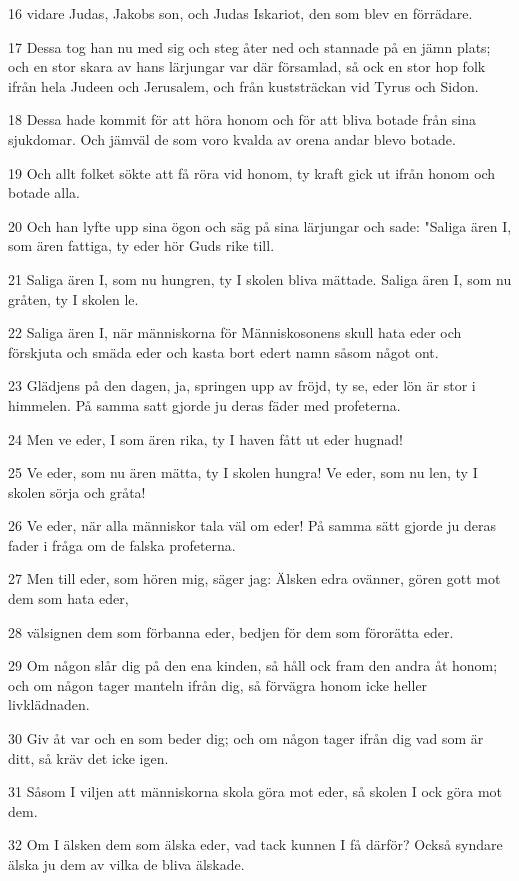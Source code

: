 \par 16 vidare Judas, Jakobs son, och Judas Iskariot, den som blev en förrädare.
\par 17 Dessa tog han nu med sig och steg åter ned och stannade på en jämn plats; och en stor skara av hans lärjungar var där församlad, så ock en stor hop folk ifrån hela Judeen och Jerusalem, och från kuststräckan vid Tyrus och Sidon.
\par 18 Dessa hade kommit för att höra honom och för att bliva botade från sina sjukdomar. Och jämväl de som voro kvalda av orena andar blevo botade.
\par 19 Och allt folket sökte att få röra vid honom, ty kraft gick ut ifrån honom och botade alla.
\par 20 Och han lyfte upp sina ögon och säg på sina lärjungar och sade: "Saliga ären I, som ären fattiga, ty eder hör Guds rike till.
\par 21 Saliga ären I, som nu hungren, ty I skolen bliva mättade. Saliga ären I, som nu gråten, ty I skolen le.
\par 22 Saliga ären I, när människorna för Människosonens skull hata eder och förskjuta och smäda eder och kasta bort edert namn såsom något ont.
\par 23 Glädjens på den dagen, ja, springen upp av fröjd, ty se, eder lön är stor i himmelen. På samma satt gjorde ju deras fäder med profeterna.
\par 24 Men ve eder, I som ären rika, ty I haven fått ut eder hugnad!
\par 25 Ve eder, som nu ären mätta, ty I skolen hungra! Ve eder, som nu len, ty I skolen sörja och gråta!
\par 26 Ve eder, när alla människor tala väl om eder! På samma sätt gjorde ju deras fader i fråga om de falska profeterna.
\par 27 Men till eder, som hören mig, säger jag: Älsken edra ovänner, gören gott mot dem som hata eder,
\par 28 välsignen dem som förbanna eder, bedjen för dem som förorätta eder.
\par 29 Om någon slår dig på den ena kinden, så håll ock fram den andra åt honom; och om någon tager manteln ifrån dig, så förvägra honom icke heller livklädnaden.
\par 30 Giv åt var och en som beder dig; och om någon tager ifrån dig vad som är ditt, så kräv det icke igen.
\par 31 Såsom I viljen att människorna skola göra mot eder, så skolen I ock göra mot dem.
\par 32 Om I älsken dem som älska eder, vad tack kunnen I få därför? Också syndare älska ju dem av vilka de bliva älskade.
